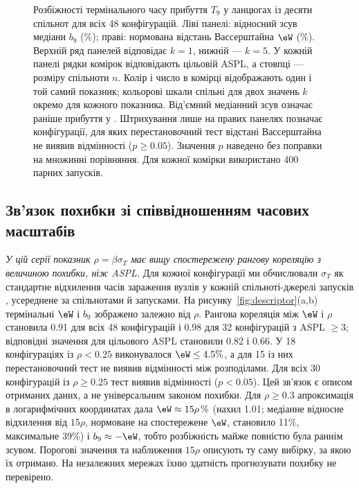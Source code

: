 \begin{figure}[tbp]
\caption{Розбіжності термінального часу прибуття $T_9$ у ланцюгах із десяти спільнот для всіх 48 конфігурацій. Ліві панелі: відносний зсув медіани $b_9$ (\%); праві: нормована відстань Вассерштайна $\eW$ (\%). Верхній ряд панелей відповідає $k=1$, нижній --- $k=5$. У кожній панелі рядки комірок відповідають цільовій ASPL, а стовпці --- розміру спільноти $n$. Колір і число в комірці відображають один і той самий показник; кольорові шкали спільні для двох значень $k$ окремо для кожного показника. Від'ємний медіанний зсув означає раніше прибуття у \TS{}. Штрихування лише на правих панелях позначає конфігурації, для яких перестановочний тест відстані Вассерштайна не виявив відмінності ($p\ge0.05$). Значення $p$ наведено без поправки на множинні порівняння. Для кожної комірки використано 400 парних запусків.}
\label{fig:accuracy_map}
\end{figure}

\subsection{Зв’язок похибки зі співвідношенням часових масштабів}
\label{sec:res_descriptor}

\emph{У цій серії показник $\rho=\beta\sigma_T$ має вищу спостережену рангову кореляцію з величиною похибки, ніж ASPL.} Для кожної конфігурації ми обчислювали $\sigma_T$ як стандартне відхилення часів зараження вузлів у кожній спільноті-джерелі запусків \Full{}, усереднене за спільнотами й запусками. На рисунку~\ref{fig:descriptor}(a,b) термінальні $\eW$ і $b_9$ зображено залежно від $\rho$. Рангова кореляція між $\eW$ і $\rho$ становила 0.91 для всіх 48 конфігурацій і 0.98 для 32 конфігурацій з ASPL $\ge3$; відповідні значення для цільового ASPL становили 0.82 і 0.66. У 18 конфігураціях із $\rho<0.25$ виконувалося $\eW\le4.5\%$, а для 15 із них перестановочний тест не виявив відмінності між розподілами. Для всіх 30 конфігурацій із $\rho\ge0.25$ тест виявив відмінності ($p<0.05$). Цей зв’язок є описом отриманих даних, а не універсальним законом похибки. Для $\rho\ge0.3$ апроксимація в логарифмічних координатах дала $\eW\approx15\rho\,\%$ (нахил 1.01; медіанне відносне відхилення від $15\rho$, нормоване на спостережене $\eW$, становило 11\%, максимальне 39\%) і $b_9\approx-\eW$, тобто розбіжність майже повністю була раннім зсувом. Порогові значення та наближення $15\rho$ описують ту саму вибірку, за якою їх отримано. На незалежних мережах їхню здатність прогнозувати похибку не перевірено.

